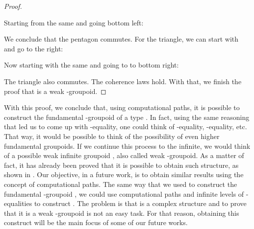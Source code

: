\documentclass[12pt, a4paper,  oneside, headinclude,footinclude, BCOR5mm]{scrartcl}
\begin{document}
\begin{proof}
\begin{center}









\end{center}

Starting from the same  and going bottom left:

\begin{center}



\end{center}

We conclude that the pentagon commutes. For the triangle, we can start with  and go to the right:

\begin{center}





\end{center}

Now starting with the same  and going to to bottom right:

\begin{center}



\end{center}

The triangle also commutes. The coherence laws hold. With that, we finish the proof that  is a weak -groupoid.

\end{proof}

With this proof, we conclude that, using computational paths, it is possible to construct the fundamental -groupoid of a type . In fact, using the same reasoning that led us to come up with -equality, one could think of -equality, -equality, etc. That way, it would be possible to think of the possibility of even higher fundamental groupoids. If we continue this process to the infinite, we would think of a possible weak infinite groupoid , also called weak -groupoid. As a matter of fact, it has already been proved that it is possible to obtain such structure, as shown in \cite{lumsdaine1, Benno}. Our objective, in a future work, is to obtain similar results using the concept of computational paths. The same way that we used to construct the fundamental -groupoid , we could use computational paths and infinite levels of -equalities to construct . The problem is that  is a complex structure and to prove that it is a weak -groupoid is not an easy task. For that reason, obtaining this construct will be the main focus of some of our future works.
\end{document}
